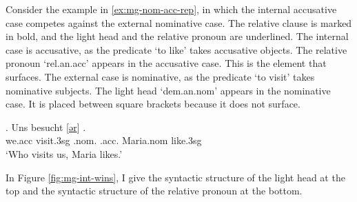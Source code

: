 Consider the example in \ref{ex:mg-nom-acc-rep}, in which the internal accusative case competes against the external nominative case. The relative clause is marked in bold, and the light head and the relative pronoun are underlined.
The internal case is accusative, as the predicate  `to like' takes accusative objects. The relative pronoun  `\ac{rel}.\ac{an}.\ac{acc}' appears in the accusative case. This is the element that surfaces.
The external case is nominative, as the predicate  `to visit' takes nominative subjects. The light head  `\ac{dem}.\ac{an}.\ac{nom}' appears in the nominative case. It is placed between square brackets because it does not surface.

\exg. Uns besucht [\underline{ər}] \underline{}  .\\
 we.\ac{acc} visit.3\ac{sg}\scsub{[nom]} .\ac{nom}. .\ac{acc}. Maria.\ac{nom} like.3\ac{sg}\scsub{[acc]}\\
 `Who visits us, Maria likes.' \label{ex:mg-nom-acc-rep}

In Figure \ref{fig:mg-int-wins}, I give the syntactic structure of the light head at the top and the syntactic structure of the relative pronoun at the bottom.

